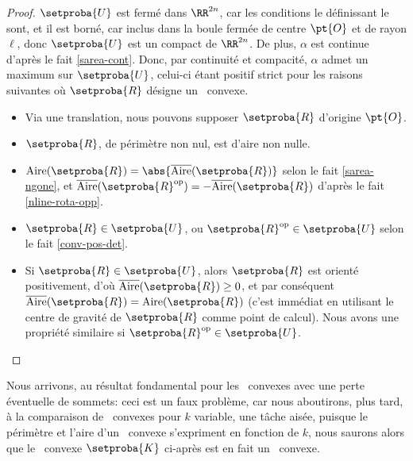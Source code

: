 \begin{proof}
     $\setproba{U}$ est fermé dans $\RR^{2n}$, car les conditions le définissant le sont, et il est borné, car inclus dans la boule fermée de centre $\pt{O}$ et de rayon $\ell$,
     donc $\setproba{U}$ est un compact de $\RR^{2n}$.
     De plus, $\alpha$ est continue d'après le fait \ref{sarea-cont}.
     Donc, par continuité et compacité, $\alpha$ admet un maximum sur $\setproba{U}$, celui-ci étant positif strict pour les raisons suivantes où $\setproba{R}$ désigne un \nreg\ convexe.
    \begin{itemize}
		\item Via une translation, nous pouvons supposer $\setproba{R}$ d'origine $\pt{O}$.


        \item $\setproba{R}$, de périmètre non nul, est d'aire non nulle.

        \item $\area{\setproba{R}} = \abs{\sarea{\setproba{R}}}$
		selon le fait \ref{sarea-ngone},
		et
		$\sarea{\setproba{R}^{\mathrm{op}}} = - \sarea{\setproba{R}}$ d'après le fait \ref{nline-rota-opp}.
		
		\item $\setproba{R} \in \setproba{U}$, ou $\setproba{R}^{\mathrm{op}} \in \setproba{U}$ selon le fait \ref{conv-pos-det}.
		
		\item Si $\setproba{R} \in \setproba{U}$, alors 
		$\setproba{R}$ est orienté positivement, 
		d'où $\sarea{\setproba{R}} \geq 0$, 
		et par conséquent $\sarea{\setproba{R}} = \area{\setproba{R}}$ 
		(c'est immédiat en utilisant le centre de gravité de $\setproba{R}$ comme point de calcul). 
		Nous avons une propriété similaire si $\setproba{R}^{\mathrm{op}} \in \setproba{U}$.
    \end{itemize}

	\null\vspace{-6ex}
\end{proof}




Nous arrivons, au résultat fondamental pour les \ngones\ convexes avec une perte éventuelle de sommets: ceci est un faux problème, car nous aboutirons, plus tard, à la comparaison de \kregs\ convexes pour $k$ variable, une tâche aisée, puisque le périmètre et l'aire d'un \kreg\ convexe s'expriment en fonction de $k$, nous saurons alors que le \kgone\ convexe $\setproba{K}$ ci-après est en fait un \nreg\ convexe.


